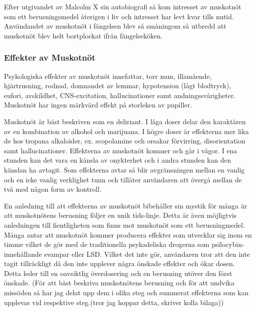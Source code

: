 Efter utgivandet av Malcolm X sin autobiografi så kom intresset av muskotnöt som ett berusningsmedel återigen i liv och intresset har levt kvar tills nutid.
Användandet av muskotnöt i fängelsen blev så småningom så utbredd att muskotnöt blev helt bortplockat ifrån fängelseköken.


\subsubsection{Effekter av Muskotnöt}

Psykologiska effekter av muskotnöt innefattar, torr mun, illamående, hjärtrusning, rodnad,
domnandet av lemmar, hypotension (lågt blodtryck), eufori, avskildhet, CNS-excitation,
hallucinationer samt andningssvårigheter.
Muskotnöt har ingen märkvärd effekt på storleken av pupiller. \cite{entheogenreview}

Muskotnöt är bäst beskriven som en deliriant. I låga doser delar den karaktären av en kombination av alkohol och marijuana. I högre doser är effekterna mer lika de hos tropana alkaloider, ex. scopolamine och orsakar förvirring, disorientation samt hallucinationer.
Effekterna av muskotnöt kommer och går i vågor. I ena stunden kan det vara en känsla av onykterhet och i andra stunden kan den känslan ha avtagit.
Som effekterna avtar så blir avgränsningen mellan en vanlig och en icke vanlig verklighet tunn och tillåter användaren att övergå mellan de två med någon form av kontroll.

En anledning till att effekterna av muskotnöt bibehåller sin mystik för många är att muskotnötens berusning följer en unik tids-linje. Detta är även möjligtvis anledningen till fientligheten som finns mot muskotnöt som ett berusningmedel. Många antar att muskotnöt kommer producera effekter som utvecklar sig inom en timme vilket de gör med de traditionella psykadeliska drogerna som psilocybin-innehållande svampar eller LSD. Vilket det inte gör, användaren tror att den inte tagit tillräckligt då den inte upplever några önskade effekter och ökar dosen. Detta leder till en oavsiktlig överdosering och en berusning utöver den först önskade. (För att bäst beskriva muskotnötens berusning och för att undvika missöden så har jag delat upp dem i olika steg och summerat effekterna som kan upplevas vid respektive steg.(tror jag hoppar detta, skriver kolla bilaga))

\\




